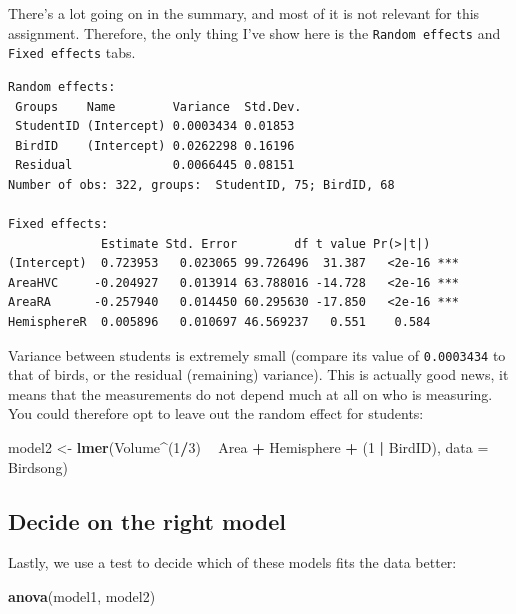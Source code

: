 \documentclass[
]{book}
\newenvironment{Shaded}{\begin{snugshade}}{\end{snugshade}}
\newcommand{\DataTypeTok}[1]{\textcolor[rgb]{0.13,0.29,0.53}{#1}}
\newcommand{\DecValTok}[1]{\textcolor[rgb]{0.00,0.00,0.81}{#1}}
\newcommand{\KeywordTok}[1]{\textcolor[rgb]{0.13,0.29,0.53}{\textbf{#1}}}
\newcommand{\NormalTok}[1]{#1}
\newcommand{\OperatorTok}[1]{\textcolor[rgb]{0.81,0.36,0.00}{\textbf{#1}}}
\newcommand{\StringTok}[1]{\textcolor[rgb]{0.31,0.60,0.02}{#1}}
\begin{document}
There's a lot going on in the summary, and most of it is not relevant for this assignment. Therefore, the only thing I've show here is the \texttt{Random\ effects} and \texttt{Fixed\ effects} tabs.

\begin{verbatim}
Random effects:
 Groups    Name        Variance  Std.Dev.
 StudentID (Intercept) 0.0003434 0.01853 
 BirdID    (Intercept) 0.0262298 0.16196 
 Residual              0.0066445 0.08151 
Number of obs: 322, groups:  StudentID, 75; BirdID, 68

Fixed effects:
             Estimate Std. Error        df t value Pr(>|t|)    
(Intercept)  0.723953   0.023065 99.726496  31.387   <2e-16 ***
AreaHVC     -0.204927   0.013914 63.788016 -14.728   <2e-16 ***
AreaRA      -0.257940   0.014450 60.295630 -17.850   <2e-16 ***
HemisphereR  0.005896   0.010697 46.569237   0.551    0.584
\end{verbatim}

Variance between students is extremely small (compare its value of \texttt{0.0003434} to that of birds, or the residual (remaining) variance). This is actually good news, it means that the measurements do not depend much at all on who is measuring. You could therefore opt to leave out the random effect for students:

\begin{Shaded}
\begin{Highlighting}[]
\NormalTok{model2 <-}\StringTok{ }\KeywordTok{lmer}\NormalTok{(Volume}\OperatorTok{^}\NormalTok{(}\DecValTok{1}\OperatorTok{/}\DecValTok{3}\NormalTok{) }\OperatorTok{~}\StringTok{ }\NormalTok{Area }\OperatorTok{+}\StringTok{ }\NormalTok{Hemisphere }\OperatorTok{+}\StringTok{ }\NormalTok{(}\DecValTok{1} \OperatorTok{|}\StringTok{ }\NormalTok{BirdID), }\DataTypeTok{data =}\NormalTok{ Birdsong)}
\end{Highlighting}
\end{Shaded}

\hypertarget{comparebrain}{%
\subsection{Decide on the right model}\label{comparebrain}}

Lastly, we use a test to decide which of these models fits the data better:

\begin{Shaded}
\begin{Highlighting}[]
\KeywordTok{anova}\NormalTok{(model1, model2)}
\end{Highlighting}
\end{Shaded}
\end{document}
